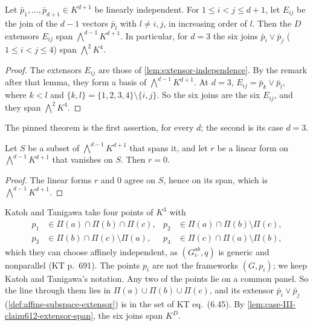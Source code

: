 \begin{lemma}
  \label{lem:case-III-claim612-extensor-span}
  \leanok
  Let $\bar p_1, \dots, \bar p_{d+1} \in K^{d+1}$ be linearly
  independent. For $1 \le i < j \le d + 1$, let $E_{ij}$ be the join of
  the $d - 1$ vectors $\bar p_l$ with $l \neq i, j$, in increasing order
  of $l$. Then the $D$ extensors $E_{ij}$ span
  $\bigwedge^{d-1} K^{d+1}$. In particular, for $d = 3$ the six joins
  $\bar p_i \vee \bar p_j$ ($1 \le i < j \le 4$) span
  $\bigwedge^2 K^4$.
\end{lemma}
\begin{proof}
  \leanok
  The extensors $E_{ij}$ are those of \cref{lem:extensor-independence}.
  By the remark after that lemma, they form a basis of
  $\bigwedge^{d-1} K^{d+1}$. At $d = 3$, $E_{ij} = \bar p_k \vee \bar p_l$,
  where $k < l$ and $\{k, l\} = \{1, 2, 3, 4\} \setminus \{i, j\}$. So
  the six joins are the six $E_{ij}$, and they span $\bigwedge^2 K^4$.
\end{proof}

\begin{fmlnote}
  The pinned theorem is the first assertion, for every $d$; the second
  is its case $d = 3$.
\end{fmlnote}

\begin{lemma}
  \label{lem:case-III-claim612-orthseq-vanish}
  \leanok
  Let $S$ be a subset of $\bigwedge^{d-1} K^{d+1}$ that spans it, and
  let $r$ be a linear form on $\bigwedge^{d-1} K^{d+1}$ that vanishes on
  $S$. Then $r = 0$.
\end{lemma}
\begin{proof}
  \leanok
  The linear forms $r$ and $0$ agree on $S$, hence on its span, which
  is $\bigwedge^{d-1} K^{d+1}$.
\end{proof}

Katoh and Tanigawa take four points of $K^3$ with
\begin{align*}
  p_1 &\in \Pi(a) \cap \Pi(b) \cap \Pi(c), &
  p_2 &\in \Pi(a) \cap \Pi(b) \setminus \Pi(c), \\
  p_3 &\in \Pi(b) \cap \Pi(c) \setminus \Pi(a), &
  p_4 &\in \Pi(c) \cap \Pi(a) \setminus \Pi(b),
\end{align*}
which they can choose affinely independent, as $(G_v^{ab}, q)$ is
generic and nonparallel (KT p.~691). The points $p_i$ are not the
frameworks $(G, p_i)$; we keep Katoh and Tanigawa's notation. Any two
of the points lie on a common panel. So the line through them lies in
$\Pi(a) \cup \Pi(b) \cup \Pi(c)$, and its extensor
$\bar p_i \vee \bar p_j$ (\cref{def:affine-subspace-extensor}) is in
the set of KT eq.~(6.45). By
\cref{lem:case-III-claim612-extensor-span}, the six joins span $K^D$.

